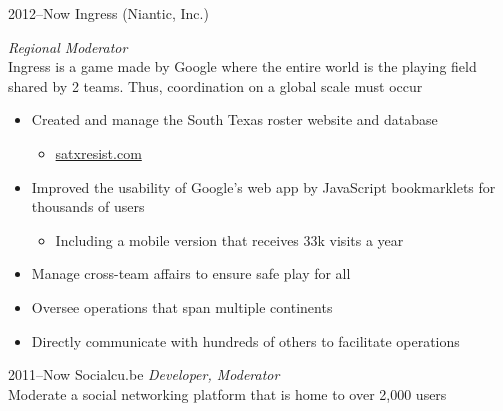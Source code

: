 \documentclass[]{friggeri-cv} %
\begin{document}
\begin{entrylist}

	\entry
	{2012--Now}
	{Ingress (Niantic, Inc.)}
	{}
	{\emph{Regional Moderator} \\
		Ingress is a game made by Google where the entire world is the playing field shared by 2 teams. Thus, coordination on a global scale must occur
		\begin{itemize}
			\item Created and manage the South Texas roster website and database
				\begin{itemize}
					\item \href{http://satxresist.com}{satxresist.com}
				\end{itemize}
			\item Improved the usability of Google's web app by JavaScript bookmarklets for thousands of users
				\begin{itemize}
					\item Including a mobile version that receives 33k visits a year
				\end{itemize}
			\item Manage cross-team affairs to ensure safe play for all
			\item Oversee operations that span multiple continents
			\item Directly communicate with hundreds of others to facilitate operations
		\end{itemize}
	}

	\entry
	{2011--Now}
	{Socialcu.be}
	{}
	{\emph{Developer, Moderator} \\
	Moderate a social networking platform that is home to over 2,000 users}



\end{entrylist}
\end{document}
